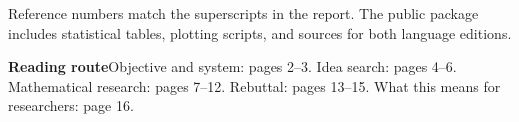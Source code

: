 \begingroup
\linespread{1.0}\selectfont
\renewcommand{\small}{\fontsize{10.2}{13.2}\selectfont}
\small
Reference numbers match the superscripts in the report. The public package includes statistical tables, plotting scripts, and sources for both language editions.

\vspace{2mm}
\begin{insight}
\textbf{Reading route}\quad Objective and system: pages 2--3. Idea search: pages 4--6. Mathematical research: pages 7--12. Rebuttal: pages 13--15. What this means for researchers: page 16.
\end{insight}
\endgroup
